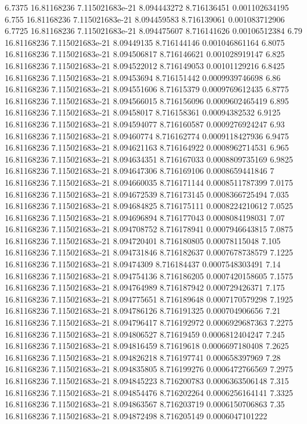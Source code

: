 {6.7375 16.81168236 7.115021683e-21 8.094443272 8.716136451 0.001102634195
6.755 16.81168236 7.115021683e-21 8.094459583 8.716139061 0.001083712906
6.7725 16.81168236 7.115021683e-21 8.094475607 8.716141626 0.00106512384
6.79 16.81168236 7.115021683e-21 8.09449135 8.716144146 0.001046861164
6.8075 16.81168236 7.115021683e-21 8.094506817 8.716146621 0.001028919147
6.825 16.81168236 7.115021683e-21 8.094522012 8.716149053 0.00101129216
6.8425 16.81168236 7.115021683e-21 8.09453694 8.716151442 0.0009939746698
6.86 16.81168236 7.115021683e-21 8.094551606 8.71615379 0.0009769612435
6.8775 16.81168236 7.115021683e-21 8.094566015 8.716156096 0.0009602465419
6.895 16.81168236 7.115021683e-21 8.09458017 8.716158361 0.00094382532
6.9125 16.81168236 7.115021683e-21 8.094594077 8.716160587 0.0009276924247
6.93 16.81168236 7.115021683e-21 8.09460774 8.716162774 0.0009118427936
6.9475 16.81168236 7.115021683e-21 8.094621163 8.716164922 0.0008962714531
6.965 16.81168236 7.115021683e-21 8.094634351 8.716167033 0.0008809735169
6.9825 16.81168236 7.115021683e-21 8.094647306 8.716169106 0.0008659441846
7 16.81168236 7.115021683e-21 8.094660035 8.716171144 0.0008511787399
7.0175 16.81168236 7.115021683e-21 8.094672539 8.716173145 0.0008366725494
7.035 16.81168236 7.115021683e-21 8.094684825 8.716175111 0.0008224210612
7.0525 16.81168236 7.115021683e-21 8.094696894 8.716177043 0.0008084198031
7.07 16.81168236 7.115021683e-21 8.094708752 8.716178941 0.0007946643815
7.0875 16.81168236 7.115021683e-21 8.094720401 8.716180805 0.00078115048
7.105 16.81168236 7.115021683e-21 8.094731846 8.716182637 0.0007678738579
7.1225 16.81168236 7.115021683e-21 8.09474309 8.716184437 0.0007548303491
7.14 16.81168236 7.115021683e-21 8.094754136 8.716186205 0.0007420158605
7.1575 16.81168236 7.115021683e-21 8.094764989 8.716187942 0.000729426371
7.175 16.81168236 7.115021683e-21 8.094775651 8.716189648 0.0007170579298
7.1925 16.81168236 7.115021683e-21 8.094786126 8.716191325 0.000704906656
7.21 16.81168236 7.115021683e-21 8.094796417 8.716192972 0.0006929687363
7.2275 16.81168236 7.115021683e-21 8.094806527 8.71619459 0.0006812404247
7.245 16.81168236 7.115021683e-21 8.094816459 8.71619618 0.0006697180408
7.2625 16.81168236 7.115021683e-21 8.094826218 8.716197741 0.000658397969
7.28 16.81168236 7.115021683e-21 8.094835805 8.716199276 0.0006472766569
7.2975 16.81168236 7.115021683e-21 8.094845223 8.716200783 0.0006363506148
7.315 16.81168236 7.115021683e-21 8.094854476 8.716202264 0.0006256164141
7.3325 16.81168236 7.115021683e-21 8.094863567 8.716203719 0.0006150706863
7.35 16.81168236 7.115021683e-21 8.094872498 8.716205149 0.0006047101222
}
